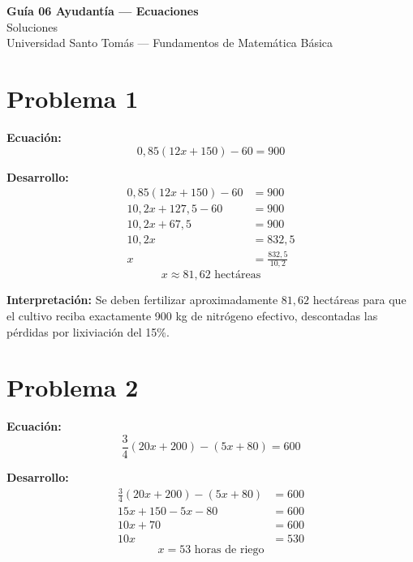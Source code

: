 \documentclass[12pt]{article}
\begin{document}
	
	\begin{center}
		{\Large \textbf{Guía 06 Ayudantía --- Ecuaciones}} \\[4pt]
		{\large Soluciones} \\[2pt]
		Universidad Santo Tomás --- Fundamentos de Matemática Básica
	\end{center}
	
	\bigskip
	
	\section*{Problema 1}
	
	\textbf{Ecuación:}
	\[
	0{,}85(12x + 150) - 60 = 900
	\]
	
	\textbf{Desarrollo:}
	\begin{align*}
		0{,}85(12x + 150) - 60 &= 900 \\
		10{,}2x + 127{,}5 - 60 &= 900 \\
		10{,}2x + 67{,}5       &= 900 \\
		10{,}2x                &= 832{,}5 \\
		x                      &= \frac{832{,}5}{10{,}2}
	\end{align*}
	\[
	\boxed{x \approx 81{,}62 \text{ hectáreas}}
	\]
	
	\textbf{Interpretación:} Se deben fertilizar aproximadamente $81{,}62$ hectáreas
	para que el cultivo reciba exactamente 900 kg de nitrógeno efectivo, descontadas
	las pérdidas por lixiviación del 15\%.
	
	\bigskip
	
	\section*{Problema 2}
	
	\textbf{Ecuación:}
	\[
	\frac{3}{4}(20x + 200) - (5x + 80) = 600
	\]
	
	\textbf{Desarrollo:}
	\begin{align*}
		\frac{3}{4}(20x + 200) - (5x + 80) &= 600 \\
		15x + 150 - 5x - 80                &= 600 \\
		10x + 70                           &= 600 \\
		10x                                &= 530
	\end{align*}
	\[
	\boxed{x = 53 \text{ horas de riego}}
	\]
	
\end{document}
